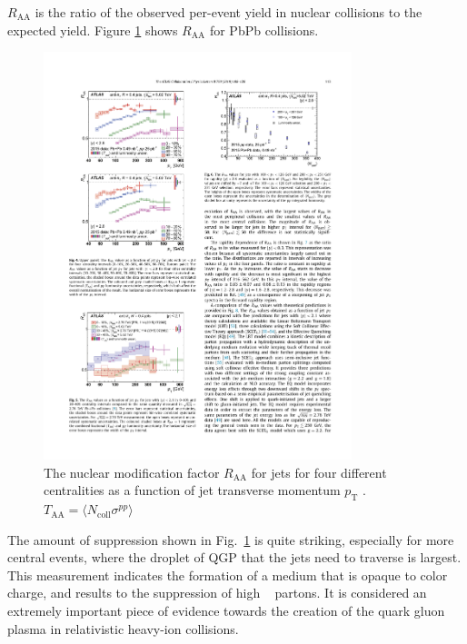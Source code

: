   $R_\mathrm{AA}$ is the ratio of the observed per-event yield in nuclear collisions to the expected yield. Figure \ref{fig:atlas_raa} shows $R_\mathrm{AA}$ for PbPb collisions.
  \begin{figure}[htpb]
    \centering
    \includegraphics[width=0.8\textwidth]{Introduction/atlas_raa.pdf}
    \caption{The nuclear modification factor $R_\mathrm{AA}$ for jets for four different centralities as a function of jet transverse momentum $p_\mathrm{T}$ \cite{Aaboud2019}. $T_\mathrm{AA} = \langle N_\mathrm{coll}\sigma^{pp}\rangle$}
    \label{fig:atlas_raa}
  \end{figure}
  The amount of suppression shown in Fig.~\ref{fig:atlas_raa} is quite striking, especially for more central events, where the droplet of QGP that the jets need to traverse is largest. This measurement indicates the formation of a medium that is opaque to color charge, and results to the suppression of high \pT~ partons. It is considered an extremely important piece of evidence towards the creation of the quark gluon plasma in relativistic heavy-ion collisions. 

